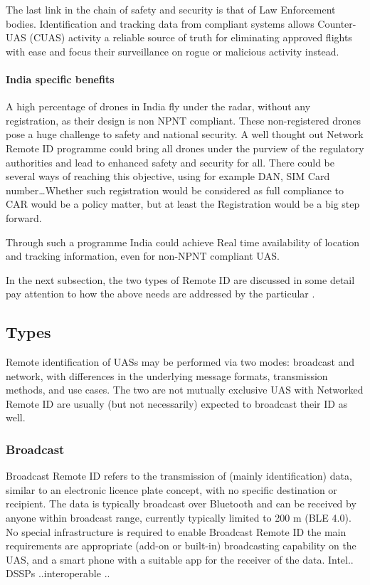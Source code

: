 \documentclass{ua_wgs_base}
\begin{document}
The last link in the chain of safety and security is that of Law Enforcement
bodies. Identification and tracking data from compliant systems allows
Counter-UAS (CUAS)
activity a reliable source of truth for eliminating approved flights
with ease and focus their surveillance on rogue or malicious activity
instead.


\paragraph{India specific benefits}

A high percentage of drones in India fly under the radar, without
any registration, as their design is non NPNT compliant. These non-registered
drones pose a huge challenge to safety and national security. A well
thought out Network Remote ID programme could bring all drones under
the purview of the regulatory authorities and lead to enhanced safety
and security for all. There could be several ways of reaching this
objective, using for example DAN, SIM Card number\dots Whether such
registration would be considered as full compliance to CAR would be
a policy matter, but at least the Registration would be a big step
forward. 

Through such a programme India could achieve Real time availability
of location and tracking information, even for non-NPNT compliant
UAS. 

In the next subsection, the two types of Remote ID are discussed in
some detail pay attention to how the above needs are addressed by
the particular .

\subsection{Types}

Remote identification of UASs may be performed via two modes: broadcast
and network, with differences in the underlying message formats, transmission
methods, and use cases. The two are not mutually exclusive \textendash{}
UAS with Networked Remote ID are usually (but not necessarily) expected
to broadcast their ID as well.

\subsubsection{Broadcast}

Broadcast Remote ID refers to the transmission of (mainly identification)
data, similar to an electronic licence plate concept, with no specific
destination or recipient. The data is typically broadcast over Bluetooth
and can be received by anyone within broadcast range, currently typically
limited to 200 m (BLE 4.0). No special infrastructure is required
to enable Broadcast Remote ID \textendash{} the main requirements
are appropriate (add-on or built-in) broadcasting capability on the
UAS, and a smart phone with a suitable app for the receiver of the
data. Intel.. DSSPs ..interoperable .. 
\end{document}
